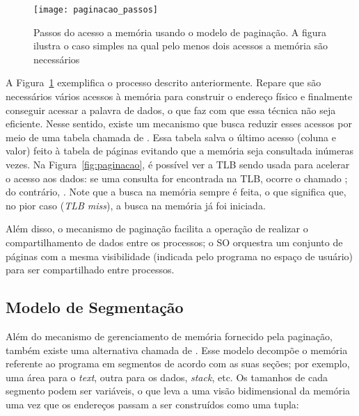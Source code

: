 \begin{figure}[!h]
  \centering
  \texttt{[image: paginacao\_passos]} 
	\caption[Passos do acesso a memória usando o modelo de paginação.]{Passos do acesso a memória usando o modelo de paginação. A figura ilustra o caso simples na qual pelo menos dois acessos a memória são necessários}
  \label{fig:passos_paginacao}
\end{figure}

A Figura~\ref{fig:passos_paginacao} exemplifica o processo descrito
anteriormente. Repare que são necessários vários acessos à memória para
construir o endereço físico e finalmente conseguir acessar a palavra de dados,
o que faz com que essa técnica não seja eficiente.
Nesse sentido, existe um mecanismo que busca reduzir esses acessos por meio de
uma tabela chamada de . Essa
tabela salva o último acesso (coluna e valor) feito à tabela de páginas
evitando que a memória seja consultada inúmeras vezes. Na
Figura~\ref{fig:paginacao}, é possível ver a TLB sendo usada para acelerar o
acesso aos dados: se uma consulta for encontrada na TLB, ocorre o chamado
; do contrário, . Note que a busca na memória sempre é feita, o que significa que,
no pior caso (\emph{TLB miss}), a busca na memória já foi iniciada.

 Além
disso, o mecanismo de paginação facilita a operação de realizar o
compartilhamento de dados entre os processos; o SO orquestra um conjunto de
páginas com a mesma visibilidade (indicada pelo programa no espaço de usuário)
para ser compartilhado entre processos.

\subsection{Modelo de Segmentação}

Além do mecanismo de gerenciamento de memória fornecido pela paginação, também
existe uma alternativa chamada de . Esse modelo
decompõe o memória referente ao programa em segmentos de acordo com as suas seções;
por exemplo, uma
área para o \textit{text}, outra para os dados, \textit{stack}, etc. Os
tamanhos de cada segmento podem ser variáveis, o que leva a uma visão
bidimensional da memória uma vez que os endereços passam a ser construídos como
uma tupla: \\

